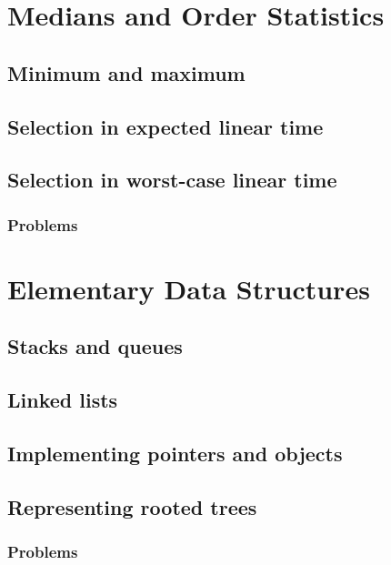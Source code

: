 \documentclass[fontsize=12pt,paper=a4]{book}
\begin{document}
\chapter{Medians and Order Statistics}

\section{Minimum and maximum}

\section{Selection in expected linear time}

\section{Selection in worst-case linear time}

\subsection*{Problems}


\chapter{Elementary Data Structures}

\section{Stacks and queues}

\section{Linked lists}

\section{Implementing pointers and objects}

\section{Representing rooted trees}

\subsection*{Problems}
\end{document}
